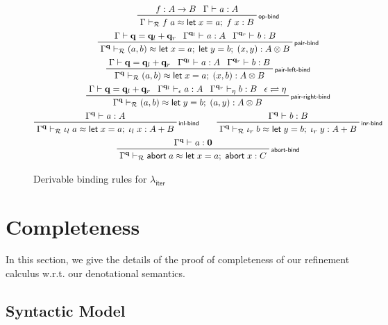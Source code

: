 \documentclass[acmsmall,screen,review]{acmart}
\newcommand{\mc}[1]{\ensuremath{\mathcal{#1}}}
\newcommand{\mb}[1]{\ensuremath{\mathbf{#1}}}
\newcommand{\ms}[1]{\ensuremath{\mathsf{#1}}}
\newcommand{\linl}[1]{\iota_l\;{#1}}
\newcommand{\linr}[1]{\iota_r\;{#1}}
\newcommand{\labort}[1]{\ms{abort}\;{#1}}
\newcommand{\letexpr}[3]{\ensuremath{\ms{let}\;#1 = #2;\;#3}}
\newcommand{\qsp}[4]{#1 \vdash #2 = #3 + #4}
\newcommand{\rle}[1]{{\scriptsize\textsf{#1}}}
\newcommand{\hasty}[4]{#1 \vdash_{#2} #3: {#4}}
\newcommand{\teqv}{\approx}
\newcommand{\tmeq}[5]{#1 \vdash_{#2} #3 \teqv #4 : {#5}}
\newcommand{\subiterexp}{\texorpdfstring{\(\lambda_{\ms{iter}}\)}{lambda-iter}}
\newcommand{\slides}{\rightleftharpoons}
\begin{document}
\begin{figure}
  \begin{gather*}
    \prftree[r]{\rle{op-bind}}
      {f : A \to B}
      {\hasty{\Gamma}{}{a}{A}}
      {\tmeq{\Gamma}{\mc{R}}{f\;a}{\letexpr{x}{a}{f\;x}}{B}} 
      \\
    \prftree[r]{\rle{pair-bind}}
      {\qsp{\Gamma}{\mb{q}}{\mb{q}_l}{\mb{q}_r}}
      {\hasty{\Gamma^{\mb{q}_l}}{}{a}{A}}
      {\hasty{\Gamma^{\mb{q}_r}}{}{b}{B}}
      {\tmeq{\Gamma^{\mb{q}}}{\mc{R}}{(a, b)}{\letexpr{x}{a}{\letexpr{y}{b}{(x, y)}}}{A \otimes B}} 
      \\
    \prftree[r]{\rle{pair-left-bind}}
      {\qsp{\Gamma}{\mb{q}}{\mb{q}_l}{\mb{q}_r}}
      {\hasty{\Gamma^{\mb{q}_l}}{}{a}{A}}
      {\hasty{\Gamma^{\mb{q}_r}}{}{b}{B}}
      {\tmeq{\Gamma^{\mb{q}}}{\mc{R}}{(a, b)}{\letexpr{x}{a}{(x, b)}}{A \otimes B}} 
      \\
    \prftree[r]{\rle{pair-right-bind}}
      {\qsp{\Gamma}{\mb{q}}{\mb{q}_l}{\mb{q}_r}}
      {\hasty{\Gamma^{\mb{q}_l}}{\epsilon}{a}{A}}
      {\hasty{\Gamma^{\mb{q}_r}}{\eta}{b}{B}}
      {\epsilon \slides \eta}
      {\tmeq{\Gamma^{\mb{q}}}{\mc{R}}{(a, b)}{\letexpr{y}{b}{(a, y)}}{A \otimes B}} 
      \\
    \prftree[r]{\rle{inl-bind}}
      {\hasty{\Gamma^{\mb{q}}}{}{a}{A}}
      {\tmeq{\Gamma^{\mb{q}}}{\mc{R}}{\linl{a}}{\letexpr{x}{a}{\linl{x}}}{A + B}} \qquad
    \prftree[r]{\rle{inr-bind}}
      {\hasty{\Gamma^{\mb{q}}}{}{b}{B}}
      {\tmeq{\Gamma^{\mb{q}}}{\mc{R}}
      {\linr{b}}{\letexpr{y}{b}{\linr{y}}}{A + B}} 
      \\
    \prftree[r]{\rle{abort-bind}}
      {\hasty{\Gamma^{\mb{q}}}{}{a}{\mb{0}}}
      {\tmeq{\Gamma^{\mb{q}}}{\mc{R}}{\labort{a}}{\letexpr{x}{a}{\labort{x}}}{C}} 
      \\
  \end{gather*}
  \caption{Derivable binding rules for \subiterexp{}}
  \Description{}
  \label{fig:derivable-binding}
\end{figure}
\section{Completeness}

\label{apx:completeness}

In this section, we give the details of the proof of completeness of our refinement calculus w.r.t.
our denotational semantics.

\subsection{Syntactic Model}
\end{document}
